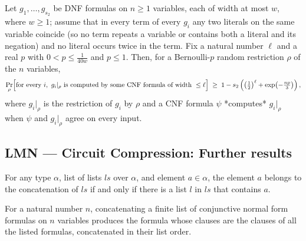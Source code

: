 \begin{theorem}
\label{LMN.one_step_reduction_with_compression}
\leanok
{}
Let $g_1,\dots,g_{s_2}$ be DNF formulas on $n \ge 1$ variables, each of width at most
$w$, where $w \ge 1$; assume that in every term of every $g_i$ any two literals on the
same variable coincide (so no term repeats a variable or contains both a literal and its
negation) and no literal occurs twice in the term. Fix a natural number $\ell$ and a
real $p$ with $0 < p \le \tfrac{1}{40w}$ and $p \le 1$. Then, for a Bernoulli-$p$ random
restriction $\rho$ of the $n$ variables,
\[
\Pr_\rho\Bigl[\text{for every } i,\ g_i|_\rho \text{ is computed by some CNF formula of
width } \le \ell\Bigr]
\;\ge\; 1 - s_2\left(\left(\tfrac12\right)^{\ell} +
\exp\!\left(-\tfrac{np}{3}\right)\right),
\]
where $g_i|_\rho$ is the restriction of $g_i$ by $\rho$ and a CNF formula $\psi$
*computes* $g_i|_\rho$ when $\psi$ and $g_i|_\rho$ agree on every input.
\end{theorem}

\subsection*{LMN --- Circuit Compression: Further results}

\begin{lemma}
\label{LMN.mem_listConcat}
\leanok
{}
For any type $\alpha$, list of lists $ls$ over $\alpha$, and element $a \in \alpha$, the
element $a$ belongs to the concatenation of $ls$ if and only if there is a list $l$ in
$ls$ that contains $a$.
\end{lemma}

\begin{definition}
\label{LMN.cnfConcat}
\leanok
{}
For a natural number $n$, concatenating a finite list of conjunctive normal form
formulas on $n$ variables produces the formula whose clauses are the clauses of all the
listed formulas, concatenated in their list order.
\end{definition}

